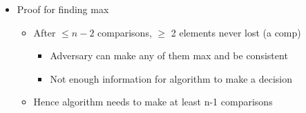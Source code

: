\documentclass{article}[18pt]
\begin{document}
\begin{itemize}
\begin{itemize}
\begin{itemize}
		\end{itemize}
		\item Proof for finding max
		\begin{itemize}
			\item After $\leqslant n-2$ comparisons, $\geqslant$ 2 elements never lost (a comp)
			\begin{itemize}
				\item Adversary can make any of them max and be consistent
				\item Not enough information for algorithm to make a decision
			\end{itemize}
			\item Hence algorithm needs to make at least n-1 comparisons
		\end{itemize}
	\end{itemize}
\end{itemize}
\end{document}
